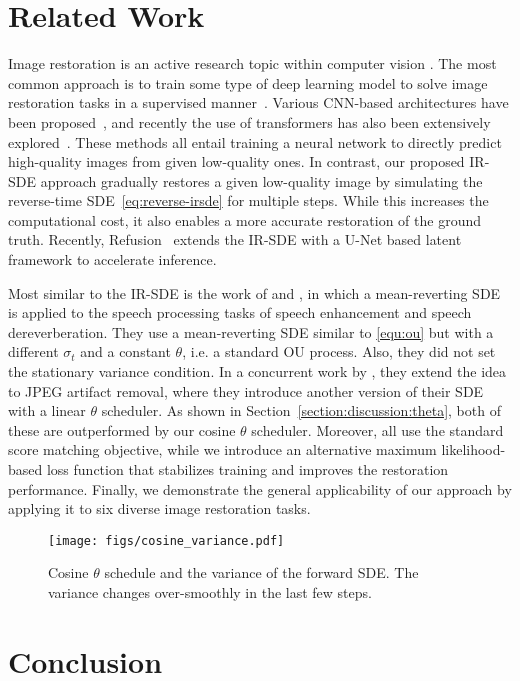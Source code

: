 \documentclass{article}
\theoremstyle{plain}
\theoremstyle{definition}
\theoremstyle{remark}
\begin{document}
 \section{Related Work}

Image restoration is an active research topic within computer vision \citep{zhang2017image,zhang2017learning,wang2022uformer,xiao2022stochastic}. The most common approach is to train some type of deep learning model to solve image restoration tasks in a supervised manner~\citep{zamir2021multi}. Various CNN-based architectures have been proposed~\citep{zamir2021multi,chen2022simple}, and recently the use of transformers has also been extensively explored~\citep{liang2021swinir,zamir2022restormer,luo2022bsrt}. These methods all entail training a neural network to directly predict high-quality images from given low-quality ones. In contrast, our proposed IR-SDE approach gradually restores a given low-quality image by simulating the reverse-time SDE~\eqref{eq:reverse-irsde} for multiple steps. 
While this increases the computational cost, it also enables a more accurate restoration of the ground truth. Recently, Refusion~\cite{luo2023refusion} extends the IR-SDE with a U-Net based latent framework to accelerate inference.

Most similar to the IR-SDE is the work of \citet{welker2022speech} and \citet{richter2022speech}, in which a mean-reverting SDE is applied to the speech processing tasks of speech enhancement and speech dereverberation. They use a mean-reverting SDE similar to \eqref{equ:ou} but with a different $\sigma_t$ and a constant $\theta$, i.e. a standard OU process. Also, they did not set the stationary variance condition. In a concurrent work by \citet{welker2022driftrec}, they extend the idea to JPEG artifact removal, where they introduce another version of their SDE with a linear $\theta$ scheduler. As shown in Section~\ref{section:discussion:theta}, both of these are outperformed by our cosine $\theta$ scheduler. Moreover, \citet{welker2022speech, richter2022speech, welker2022driftrec} all use the standard score matching objective, while we introduce an alternative maximum likelihood-based loss function that stabilizes training and improves the restoration performance. Finally, we demonstrate the general applicability of our approach by applying it to six diverse image restoration tasks.


\begin{figure}[t]
\begin{center}
\centerline{\texttt{[image: figs/cosine\_variance.pdf]}}\vspace{-2.0mm}
\caption{Cosine $\theta$ schedule and the variance of the forward SDE. The variance changes over-smoothly in the last few steps. }
\label{fig:cosine_variance}
\end{center}
\vskip -0.2in
\end{figure} \section{Conclusion}
\end{document}
